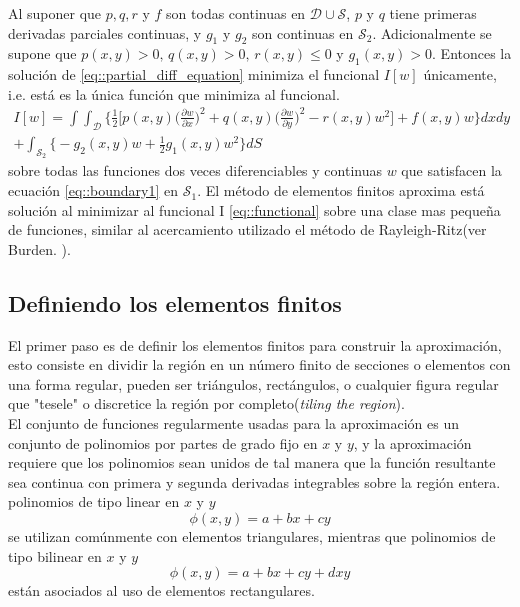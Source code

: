 \documentclass[a4paper]{article}
\begin{document}
Al suponer que $p,q,r$ y $f$ son todas continuas en $\mathcal{D}\cup\mathcal{S}$, $p$ y $q$ tiene primeras derivadas parciales continuas, y $g_1$ y $g_2$ son continuas en $\mathcal{S}_2$. Adicionalmente se supone que $p(x,y)>0, \, q(x,y)>0,\,r(x,y)\leq 0$ y $g_1(x,y)>0$. Entonces la solución de \ref{eq::partial_diff_equation} minimiza el funcional $I[w]$ únicamente, i.e. está es la única función que minimiza al funcional.
\begin{equation}\label{eq::functional}
\begin{aligned}
I[w]=\int\int_{\mathcal{D}}\Bigg\{ \frac{1}{2}\Big[p(x,y)\Big( \frac{\partial w}{\partial x} \Big)^2 + q(x,y)\Big( \frac{\partial w}{\partial y} \Big)^2 -r(x,y) w^2 \Big] +f(x,y)w\Bigg\}dx dy\\
+\int_{\mathcal{S}_2}\Bigg\{ -g_2(x,y)w+\frac{1}{2}g_1(x,y)w^2 \Bigg\}dS
\end{aligned}
\end{equation}
sobre todas las funciones dos veces diferenciables y continuas $w$ que satisfacen la ecuación \ref{eq::boundary1} en $\mathcal{S}_1$. El método de elementos finitos aproxima está solución al minimizar al funcional I \ref{eq::functional} sobre una clase mas pequeña de funciones, similar al acercamiento utilizado el método de Rayleigh-Ritz(ver Burden. \cite{Burden}).
\subsection{Definiendo los elementos finitos}
El primer paso es de definir los elementos finitos para construir la aproximación, esto consiste en dividir la región en un número finito de secciones o elementos con una forma regular, pueden ser triángulos, rectángulos, o cualquier figura regular que "tesele" o discretice la región por completo(\textit{tiling the region}).\\

El conjunto de funciones regularmente usadas para la aproximación es un conjunto de polinomios por partes de grado fijo en $x$ y $y$, y la aproximación requiere que los polinomios sean unidos de tal manera que la función resultante sea continua con primera y segunda derivadas integrables sobre la región entera. polinomios de tipo linear en $x$ y $y$ 
\begin{equation}
\phi(x,y)=a+bx+cy
\end{equation}
se utilizan comúnmente con elementos triangulares, mientras que polinomios de tipo bilinear en $x$ y $y$
\begin{equation}
\phi(x,y)=a+bx+cy+dxy
\end{equation}
están asociados al uso de elementos rectangulares.\\
\end{document}
